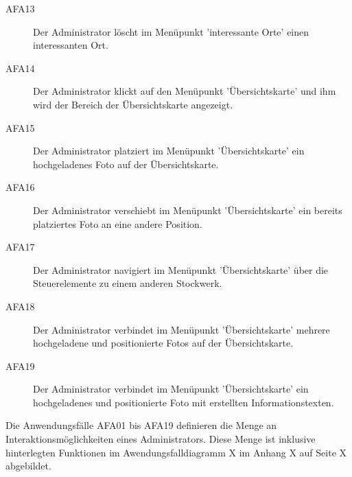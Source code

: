 \begin{description}
  \item[AFA13] Der Administrator löscht im Menüpunkt 'interessante Orte' einen interessanten Ort.
  \item[AFA14] Der Administrator klickt auf den Menüpunkt 'Übersichtskarte' und ihm wird der Bereich der Übersichtskarte angezeigt.
  \item[AFA15] Der Administrator platziert im Menüpunkt 'Übersichtskarte' ein hochgeladenes Foto auf der Übersichtskarte.
  \item[AFA16] Der Administrator verschiebt im Menüpunkt 'Übersichtskarte' ein bereits platziertes Foto an eine andere Position.
  \item[AFA17] Der Administrator navigiert im Menüpunkt 'Übersichtskarte' über die Steuerelemente zu einem anderen Stockwerk.
  \item[AFA18] Der Administrator verbindet im Menüpunkt 'Übersichtskarte' mehrere hochgeladene und positionierte Fotos auf der Übersichtskarte.
  \item[AFA19] Der Administrator verbindet im Menüpunkt 'Übersichtskarte' ein hochgeladenes und positionierte Foto mit erstellten Informationstexten.
\end{description}

Die Anwendungsfälle AFA01 bis AFA19 definieren die Menge an Interaktionsmöglichkeiten eines Administrators. Diese Menge ist inklusive hinterlegten Funktionen im Awendungsfalldiagramm X im Anhang X auf Seite X abgebildet.